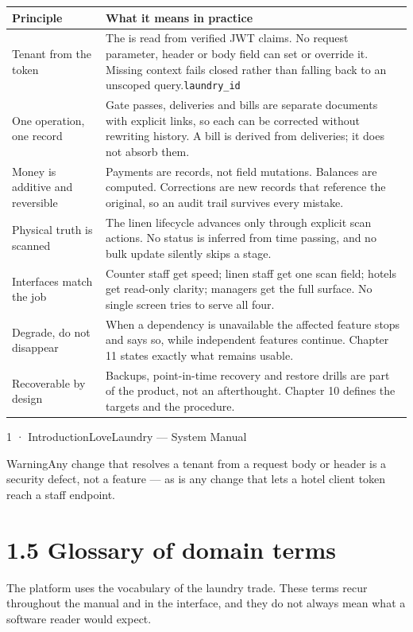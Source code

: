 \documentclass[11pt,a4paper,oneside]{book}
\begin{document}
\begin{center}\small
\begin{tabularx}{\linewidth}{|X|X|}
\hline
\rowcolor{lightgrey}
\textbf{Principle} & \textbf{What it means in practice} \\ \hline
Tenant from the token & The  is read from verified JWT claims. No request parameter, header or body field can set or override it. Missing context fails closed rather than falling back to an unscoped query.\texttt{laundry\_id} \\ \hline
One operation, one record & Gate passes, deliveries and bills are separate documents with explicit links, so each can be corrected without rewriting history. A bill is derived from deliveries; it does not absorb them. \\ \hline
Money is additive and reversible & Payments are records, not field mutations. Balances are computed. Corrections are new records that reference the original, so an audit trail survives every mistake. \\ \hline
Physical truth is scanned & The linen lifecycle advances only through explicit scan actions. No status is inferred from time passing, and no bulk update silently skips a stage. \\ \hline
Interfaces match the job & Counter staff get speed; linen staff get one scan field; hotels get read-only clarity; managers get the full surface. No single screen tries to serve all four. \\ \hline
Degrade, do not disappear & When a dependency is unavailable the affected feature stops and says so, while independent features continue. Chapter 11 states exactly what remains usable. \\ \hline
Recoverable by design & Backups, point-in-time recovery and restore drills are part of the product, not an afterthought. Chapter 10 defines the targets and the procedure. \\ \hline
\end{tabularx}
\end{center}
1 · IntroductionLoveLaundry — System Manual

\begin{notebox}WarningAny change that resolves a tenant from a request body or header is a security defect, not a feature — as is any change that lets a hotel client token reach a staff endpoint.\end{notebox}
\section{1.5 Glossary of domain terms}
The platform uses the vocabulary of the laundry trade. These terms recur throughout the manual and in the interface, and they do not always mean what a software reader would expect.
\end{document}
